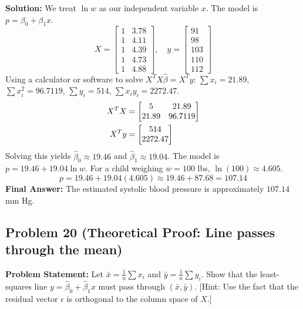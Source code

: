 \documentclass[11pt, letterpaper]{article}
\theoremstyle{definition}
\theoremstyle{remark}
\begin{document}
\textbf{Solution:}
We treat $\ln w$ as our independent variable $x$. The model is $p = \beta_0 + \beta_1 x$.
\[
X = \begin{bmatrix} 1 & 3.78 \\ 1 & 4.11 \\ 1 & 4.39 \\ 1 & 4.73 \\ 1 & 4.88 \end{bmatrix}, \quad y = \begin{bmatrix} 91 \\ 98 \\ 103 \\ 110 \\ 112 \end{bmatrix}
\]
Using a calculator or software to solve $X^T X \hat{\beta} = X^T y$:
$\sum x_i = 21.89$, $\sum x_i^2 = 96.7119$, $\sum y_i = 514$, $\sum x_i y_i = 2272.47$.
\begin{align*}
X^T X &= \begin{bmatrix} 5 & 21.89 \\ 21.89 & 96.7119 \end{bmatrix} \\ \relax
X^T y &= \begin{bmatrix} 514 \\ 2272.47 \end{bmatrix}
\end{align*}
Solving this yields $\hat{\beta}_0 \approx 19.46$ and $\hat{\beta}_1 \approx 19.04$.
The model is $p = 19.46 + 19.04 \ln w$.
For a child weighing $w = 100$ lbs, $\ln(100) \approx 4.605$.
\[ p = 19.46 + 19.04(4.605) \approx 19.46 + 87.68 = 107.14 \]
\textbf{Final Answer:} The estimated systolic blood pressure is approximately $\displaystyle 107.14$ mm Hg.

\subsection*{Problem 20 (Theoretical Proof: Line passes through the mean)}
\textbf{Problem Statement:} Let $\bar{x} = \frac{1}{n}\sum x_i$ and $\bar{y} = \frac{1}{n}\sum y_i$. Show that the least-squares line $y = \hat{\beta}_0 + \hat{\beta}_1 x$ must pass through $(\bar{x}, \bar{y})$. [Hint: Use the fact that the residual vector $\epsilon$ is orthogonal to the column space of $X$.]
\end{document}

